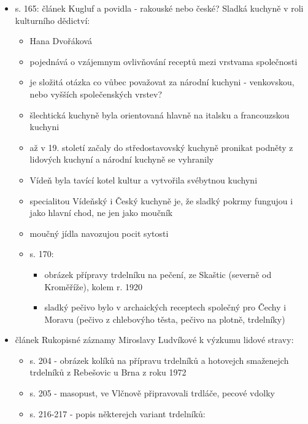 \begin{itemize}
  \begin{itemize}
  \tightlist
  \item
    s. 165: článek Kugluf a povidla - rakouské nebo české? Sladká
    kuchyně v roli kulturního dědictví:

    \begin{itemize}
    \tightlist
    \item
      Hana Dvořáková
    \item
      pojednává o vzájemnym ovlivňování receptů mezi vrstvama
      společnosti
    \item
      je složitá otázka co vůbec považovat za národní kuchyni -
      venkovskou, nebo vyšších společenských vrstev?
    \item
      šlechtická kuchyně byla orientovaná hlavně na italsku a
      francouzskou kuchyni
    \item
      až v 19. století začaly do středostavovský kuchyně pronikat
      podněty z lidových kuchyní a národní kuchyně se vyhranily
    \item
      Vídeň byla tavící kotel kultur a vytvořila svébytnou kuchyni
    \item
      specialitou Vídeňský i Český kuchyně je, že sladký pokrmy fungujou
      i jako hlavní chod, ne jen jako moučník
    \item
      moučný jídla navozujou pocit sytosti
    \item
      s. 170:

      \begin{itemize}
      \tightlist
      \item
        obrázek přípravy trdelníku na pečení, ze Skaštic (severně od
        Kroměříže), kolem r. 1920
      \item
        sladký pečivo bylo v archaických receptech společný pro Čechy i
        Moravu (pečivo z chlebovýho těsta, pečivo na plotně, trdelníky)
      \end{itemize}
    \end{itemize}
  \item
    článek Rukopisné záznamy Miroslavy Ludvíkové k výzkumu lidové
    stravy:

    \begin{itemize}
    \tightlist
    \item
      s. 204 - obrázek kolíků na přípravu trdelníků a hotovejch
      smaženejch trdelníků z Rebešovic u Brna z roku 1972
    \item
      s. 205 - masopust, ve Vlčnově připravovali trdláče, pecové vdolky
    \item
      s. 216-217 - popis některejch variant trdelníků:


\end{itemize}
\end{itemize}
\end{itemize}
